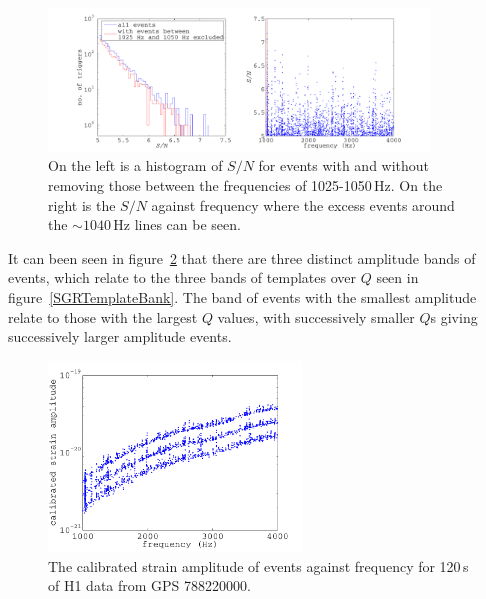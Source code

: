 \begin{figure}[!htbp]
\begin{center}
\includegraphics[width=0.9\textwidth]{figs/H1RingdownBgSNRNoLine}
\caption[A histogram of $S/n$ for events with and without certain frequencies removed.]{On the left
is a histogram of $S/N$ for events with and without removing those between the frequencies of
1025-1050\,Hz. On the right is the $S/N$ against frequency where the excess events around the $\sim
1040$\,Hz lines can be seen.}\label{H1RingdownBgSNRNoLine}
\end{center}
\end{figure}
It can been seen in figure~\ref{H1RingdownBgAmp} that there are three distinct amplitude bands of
events, which relate to the three bands of templates over $Q$ seen in figure~\ref{SGRTemplateBank}.
The band of events with the smallest amplitude relate to those with the largest $Q$ values, with
successively smaller $Q$s giving successively larger amplitude events. 
\begin{figure}[!htbp]
\begin{center}
\includegraphics[width=0.6\textwidth]{figs/H1RingdownBgAmp}\caption{The calibrated
strain amplitude of events against frequency for 120\,s of H1 data from GPS
788220000.}\label{H1RingdownBgAmp}
\end{center}
\end{figure}

